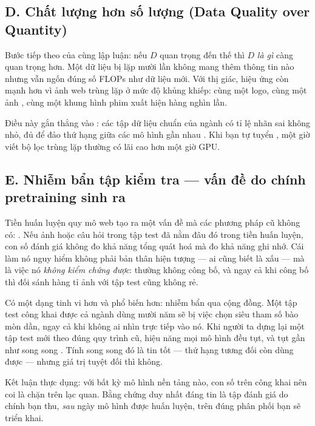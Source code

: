 \documentclass[../../../deep_learning.tex]{subfiles}
\begin{document}
\subsection{D. Chất lượng hơn số lượng (Data Quality over Quantity)}
Bước tiếp theo của cùng lập luận: nếu $D$ quan trọng đến thế thì $D$ \emph{là gì} càng quan trọng hơn. Một dữ liệu bị lặp mười lần không mang thêm thông tin nào nhưng vẫn ngốn đúng số FLOPs như dữ liệu mới. Với thị giác, hiệu ứng còn mạnh hơn vì ảnh web trùng lặp ở mức độ khủng khiếp: cùng một logo, cùng một ảnh , cùng một khung hình phim xuất hiện hàng nghìn lần.

Điều này gắn thẳng vào : các tập dữ liệu chuẩn của ngành có tỉ lệ nhãn sai không nhỏ, đủ để đảo thứ hạng giữa các mô hình gần nhau \cite{northcutt2021pervasive}. Khi bạn tự tuyển , một giờ viết bộ lọc trùng lặp thường có lãi cao hơn một giờ GPU.

\subsection{E. Nhiễm bẩn tập kiểm tra --- vấn đề do chính pretraining sinh ra}
Tiền huấn luyện quy mô web tạo ra một vấn đề mà các phương pháp cũ không có: . Nếu ảnh hoặc câu hỏi trong tập test đã nằm đâu đó trong  tiền huấn luyện, con số đánh giá không đo khả năng tổng quát hoá mà đo khả năng ghi nhớ. Cái làm nó nguy hiểm không phải bản thân hiện tượng --- ai cũng biết là xấu --- mà là việc nó \emph{không kiểm chứng được}:  thường không công bố, và ngay cả khi công bố thì đối sánh hàng tỉ ảnh với tập test cũng không rẻ.

Có một dạng tinh vi hơn và phổ biến hơn: nhiễm bẩn qua cộng đồng. Một tập test công khai được cả ngành dùng mười năm sẽ bị việc chọn siêu tham số bào mòn dần, ngay cả khi không ai nhìn trực tiếp vào nó. Khi người ta dựng lại một tập test mới theo đúng quy trình cũ, hiệu năng mọi mô hình đều tụt, và tụt gần như song song \cite{recht2019imagenet}. Tính song song đó là tin tốt --- thứ hạng tương đối còn dùng được --- nhưng giá trị tuyệt đối thì không.

Kết luận thực dụng: với bất kỳ mô hình nền tảng nào, con số  trên  công khai nên coi là chặn trên lạc quan. Bằng chứng duy nhất đáng tin là tập đánh giá do chính bạn thu, \emph{sau} ngày mô hình được huấn luyện, trên đúng phân phối bạn sẽ triển khai.

\end{document}
